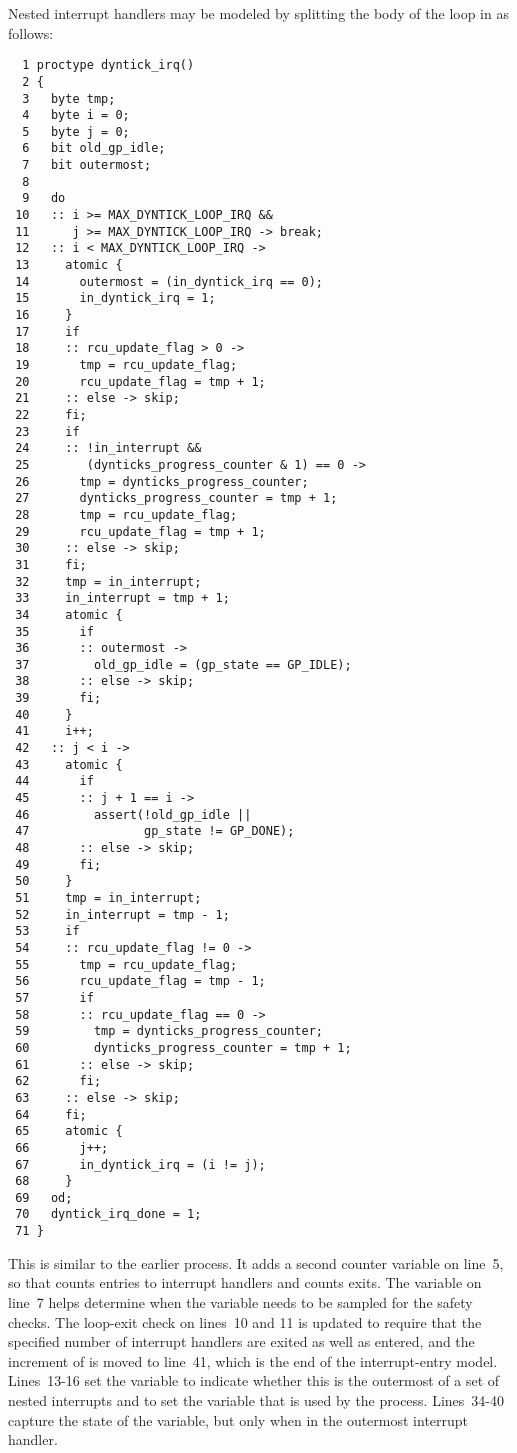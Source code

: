 Nested interrupt handlers may be modeled by splitting the body of
the loop in  as follows:

{ \scriptsize
\begin{verbatim}
  1 proctype dyntick_irq()
  2 {
  3   byte tmp;
  4   byte i = 0;
  5   byte j = 0;
  6   bit old_gp_idle;
  7   bit outermost;
  8
  9   do
 10   :: i >= MAX_DYNTICK_LOOP_IRQ &&
 11      j >= MAX_DYNTICK_LOOP_IRQ -> break;
 12   :: i < MAX_DYNTICK_LOOP_IRQ ->
 13     atomic {
 14       outermost = (in_dyntick_irq == 0);
 15       in_dyntick_irq = 1;
 16     }
 17     if
 18     :: rcu_update_flag > 0 ->
 19       tmp = rcu_update_flag;
 20       rcu_update_flag = tmp + 1;
 21     :: else -> skip;
 22     fi;
 23     if
 24     :: !in_interrupt &&
 25        (dynticks_progress_counter & 1) == 0 ->
 26       tmp = dynticks_progress_counter;
 27       dynticks_progress_counter = tmp + 1;
 28       tmp = rcu_update_flag;
 29       rcu_update_flag = tmp + 1;
 30     :: else -> skip;
 31     fi;
 32     tmp = in_interrupt;
 33     in_interrupt = tmp + 1;
 34     atomic {
 35       if
 36       :: outermost ->
 37         old_gp_idle = (gp_state == GP_IDLE);
 38       :: else -> skip;
 39       fi;
 40     }
 41     i++;
 42   :: j < i ->
 43     atomic {
 44       if
 45       :: j + 1 == i ->
 46         assert(!old_gp_idle ||
 47                gp_state != GP_DONE);
 48       :: else -> skip;
 49       fi;
 50     }
 51     tmp = in_interrupt;
 52     in_interrupt = tmp - 1;
 53     if
 54     :: rcu_update_flag != 0 ->
 55       tmp = rcu_update_flag;
 56       rcu_update_flag = tmp - 1;
 57       if
 58       :: rcu_update_flag == 0 ->
 59         tmp = dynticks_progress_counter;
 60         dynticks_progress_counter = tmp + 1;
 61       :: else -> skip;
 62       fi;
 63     :: else -> skip;
 64     fi;
 65     atomic {
 66       j++;
 67       in_dyntick_irq = (i != j);
 68     }
 69   od;
 70   dyntick_irq_done = 1;
 71 }
\end{verbatim}
}

This is similar to the earlier  process.
It adds a second counter variable  on line~5, so that
 counts entries to interrupt handlers and 
counts exits.
The  variable on line~7 helps determine
when the  variable needs to be sampled
for the safety checks.
The loop-exit check on lines~10 and 11 is updated to require that the
specified number of interrupt handlers are exited as well as entered,
and the increment of  is moved to line~41, which is
the end of the interrupt-entry model.
Lines~13-16 set the  variable to indicate
whether this is the outermost of a set of nested interrupts and to
set the  variable that is used by the
 process.
Lines~34-40 capture the state of the 
variable, but only when in the outermost interrupt handler.

